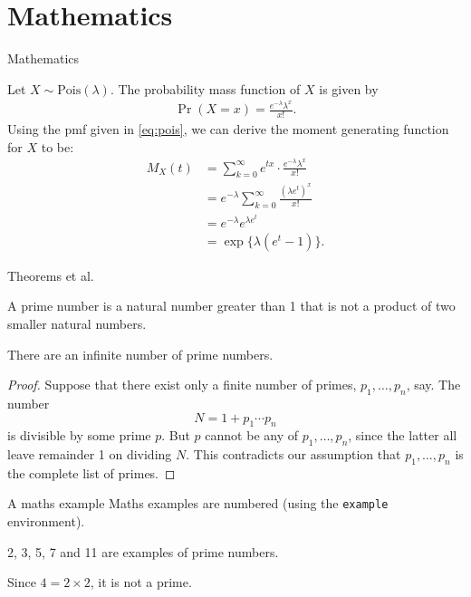 \documentclass[]{beamer}
\begin{document}
\section{Mathematics}



\begin{frame}{Mathematics}

Let $X\sim\mathrm{Pois}(\lambda)$. 
The probability mass function of $X$ is given by
\begin{align}\label{eq:pois}
	\Pr(X=x) = \frac{e^{-\lambda}\lambda^x}{x!}.
\end{align}
Using the pmf given in \eqref{eq:pois}, we can derive the moment generating function for $X$ to be:
\begin{align*}
	M_X(t) 
	&= \sum_{k=0}^\infty e^{tx} \cdot \frac{e^{-\lambda}\lambda^x}{x!} \\
	&= e^{-\lambda} \sum_{k=0}^\infty  \frac{(\lambda e^t)^x}{x!} \\
	&= e^{-\lambda}  e^{\lambda e^t} \\
	&= \exp\{\lambda(e^t - 1) \}.
\end{align*}


\end{frame}

\begin{frame}{Theorems et al.}

\begin{definition}
	A prime number is a natural number greater than 1 that is not a product of two smaller natural numbers.
\end{definition}

\begin{theorem}
	There are an infinite number of prime numbers.
\end{theorem}

\begin{proof}
	Suppose that there exist only a finite number of primes, $p_1,\dots,p_n$, say.
	The number 
	\[
	  N = 1+p_1\cdots p_n
	\]
	is divisible by some prime $p$.
	But $p$ cannot be any of $p_1,\dots,p_n$, since the latter all leave remainder 1 on dividing $N$.
	This contradicts our assumption that $p_1,\dots,p_n$ is the complete list of primes.
\end{proof}

\end{frame}

\begin{frame}{A maths example}
	Maths examples are numbered (using the \texttt{example} environment).
	
	\begin{example}
		2, 3, 5, 7 and 11 are examples of prime numbers.
	\end{example}

	\begin{example}
		Since $4 = 2 \times 2$, it is not a prime.
	\end{example}

\end{frame}
\end{document}
